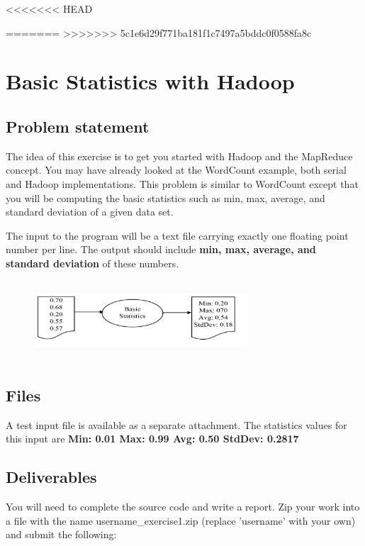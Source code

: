 <<<<<<< HEAD
\FILENAME

=======
>>>>>>> 5c1e6d29f771ba181f1c7497a5bddc0f0588fa8c
\section*{Basic Statistics with Hadoop}       

\subsection*{Problem statement}
 
The idea of this exercise is to get you started with Hadoop and the MapReduce
concept. You may have already looked at the WordCount example, both serial and
Hadoop implementations. This problem is similar to WordCount except that you
will be computing the basic statistics such as min, max, average, and standard
deviation of a given data set.

The input to the program will be a text file carrying exactly one floating
point number per line. The output should include \textbf{min, max, average, and
standard deviation} of these numbers.

\begin{figure}[!htbp]
\includegraphics[width=8cm,height=3cm]{section/icloud/assignment/problems/project1/p1example.png}
\centering
\end{figure}

\subsection*{Files}
A test input file is available as a separate attachment.
The statistics values for this input are \textbf{Min: 0.01 Max: 0.99 Avg: 0.50 StdDev: 0.2817}


\subsection*{Deliverables}

You will need to complete the source code and write a report. Zip your work
into a file with the name username\_exercise1.zip (replace 'username' with your
own) and submit the following:

